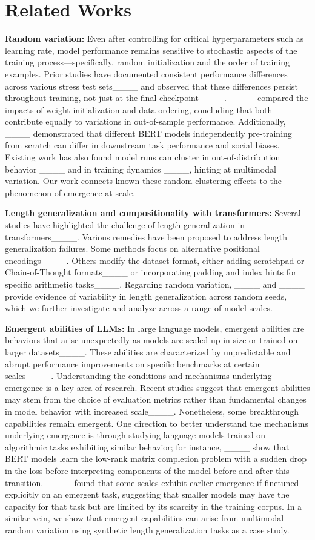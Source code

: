 \section{Related Works}
\textbf{Random variation:} Even after controlling for critical hyperparameters such as learning rate, model performance remains sensitive to stochastic aspects of the training process---specifically, random initialization and the order of training examples. Prior studies have documented consistent performance differences across various stress test sets____ and observed that these differences persist throughout training, not just at the final checkpoint____. ____ compared the impacts of weight initialization and data ordering, concluding that both contribute equally to variations in out-of-sample performance. 
Additionally, ____ demonstrated that different BERT models independently pre-training  from scratch can differ in downstream task performance and social biases. Existing work has also found model runs can cluster in out-of-distribution behavior ____ and in training dynamics ____, hinting at multimodal variation. Our work connects known these random clustering effects to the phenomenon of emergence at scale.

\textbf{Length generalization and compositionality with transformers:} Several studies have highlighted the challenge of length generalization in transformers____. Various remedies have been proposed to address length generalization failures. Some methods focus on alternative positional encodings____. Others modify the dataset format, either adding scratchpad or Chain-of-Thought formats____ or incorporating padding and index hints for specific arithmetic tasks____. Regarding random variation, ____ and ____ provide evidence of variability in length generalization across random seeds, which we further investigate and analyze across a range of model scales.

\textbf{Emergent abilities of LLMs:} In large language models, emergent abilities are behaviors that arise unexpectedly as models are scaled up in size or trained on larger datasets____. These abilities are characterized by unpredictable and abrupt performance improvements on specific benchmarks at certain scales____. Understanding the conditions and mechanisms underlying emergence is a key area of research. Recent studies suggest that emergent abilities may stem from the choice of evaluation metrics rather than fundamental changes in model behavior with increased scale____. Nonetheless, some breakthrough capabilities remain emergent. One direction to better understand the mechanisms underlying emergence is through studying language models trained on algorithmic tasks exhibiting similar behavior; for instance, ____ show that BERT models learn the low-rank matrix completion problem with a sudden drop in the loss before interpreting components of the model before and after this transition.  ____ found that some scales exhibit earlier emergence if finetuned explicitly on an emergent task, suggesting that smaller models may have the capacity for that task but are limited by its scarcity in the training corpus.  In a similar vein, we show that emergent capabilities can arise from multimodal random variation using synthetic length generalization tasks as a case study.

